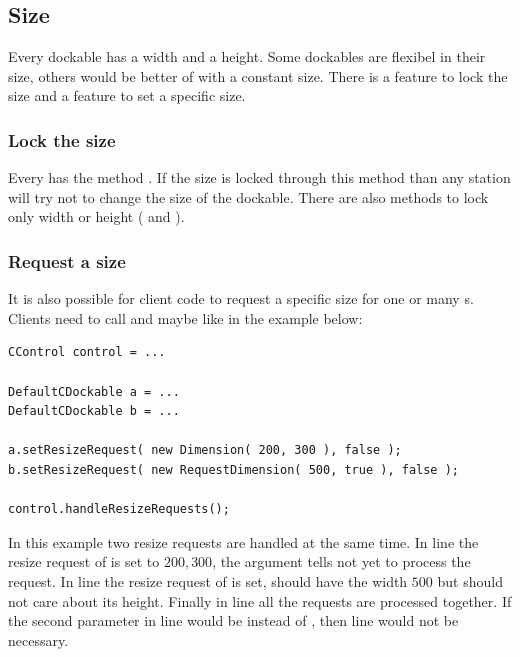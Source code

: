 
\subsection{Size} \label{sec:size}
Every dockable has a width and a height. Some dockables are flexibel in their size, others would be better of with a constant size. There is a feature to lock the size and a feature to set a specific size.

\subsubsection{Lock the size}
Every  has the method . If the size is locked through this method than any station will try not to change the size of the dockable. There are also methods to lock only width or height \linebreak ( and ).


\subsubsection{Request a size}
It is also possible for client code to request a specific size for one or many s. Clients need to call  and maybe \linebreak {} like in the example below:

\begin{lstlisting}
CControl control = ...

DefaultCDockable a = ...
DefaultCDockable b = ...

a.setResizeRequest( new Dimension( 200, 300 ), false );
b.setResizeRequest( new RequestDimension( 500, true ), false );

control.handleResizeRequests();
\end{lstlisting}
In this example two resize requests are handled at the same time. In line  the resize request of  is set to $200, 300$, the argument  tells  not yet to process the request. In line  the resize request of  is set,  should have the width $500$ but should not care about its height. Finally in line  all the requests are processed together. If the second parameter in line  would be  instead of , then line  would not be necessary.

